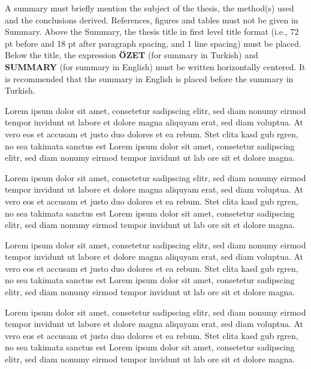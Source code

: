 \begin{summary}
A summary must briefly mention the subject of the thesis, the method(s) used and the conclusions derived. References, figures and tables must not be given in Summary. Above the Summary, the thesis title in first level title format (i.e., 72 pt before and 18 pt after paragraph spacing, and 1 line spacing) must be placed. Below the title, the expression \textbf{ÖZET }(for summary in Turkish) and \textbf{SUMMARY }(for summary in English) must be written horizontally centered. It is recommended that the summary in English is placed before the summary in Turkish.

Lorem ipsum dolor sit amet, consetetur sadipscing elitr, sed diam nonumy eirmod tempor invidunt ut labore et dolore magna aliquyam erat, sed diam voluptua. At vero eos et accusam et justo duo dolores et ea rebum. Stet clita kasd gub rgren, no sea takimata sanctus est Lorem ipsum dolor sit amet, consetetur sadipscing elitr, sed diam nonumy eirmod tempor invidunt ut lab ore sit et dolore magna.

Lorem ipsum dolor sit amet, consetetur sadipscing elitr, sed diam nonumy eirmod tempor invidunt ut labore et dolore magna aliquyam erat, sed diam voluptua. At vero eos et accusam et justo duo dolores et ea rebum. Stet clita kasd gub rgren, no sea takimata sanctus est Lorem ipsum dolor sit amet, consetetur sadipscing elitr, sed diam nonumy eirmod tempor invidunt ut lab ore sit et dolore magna.

Lorem ipsum dolor sit amet, consetetur sadipscing elitr, sed diam nonumy eirmod tempor invidunt ut labore et dolore magna aliquyam erat, sed diam voluptua. At vero eos et accusam et justo duo dolores et ea rebum. Stet clita kasd gub rgren, no sea takimata sanctus est Lorem ipsum dolor sit amet, consetetur sadipscing elitr, sed diam nonumy eirmod tempor invidunt ut lab ore sit et dolore magna.

Lorem ipsum dolor sit amet, consetetur sadipscing elitr, sed diam nonumy eirmod tempor invidunt ut labore et dolore magna aliquyam erat, sed diam voluptua. At vero eos et accusam et justo duo dolores et ea rebum. Stet clita kasd gub rgren, no sea takimata sanctus est Lorem ipsum dolor sit amet, consetetur sadipscing elitr, sed diam nonumy eirmod tempor invidunt ut lab ore sit et dolore magna.


\end{summary}
